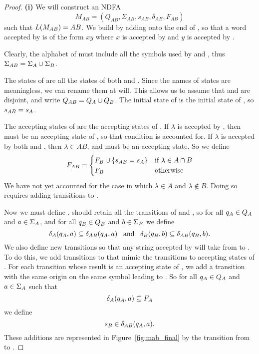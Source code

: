 \documentclass{bcthesis}
\begin{document}
\begin{proof}
		\noindent \textbf{(i)} \hspace{\parindent}
		We will construct an NDFA 
		\[
			M_{AB} = (Q_{AB}, \Sigma_{AB}, s_{AB}, \delta_{AB}, F_{AB})
		\]
		such that $L(M_{AB}) = AB$.
		We build \mab by adding \mb onto the end of \ma, so that a word accepted by \mab is of the form $xy$ where $x$ is accepted by \ma and $y$ is accepted by \mb.

		Clearly, the alphabet of \mab must include all the symbols used by \ma and \mb, thus $\Sigma_{AB} = \Sigma_A \cup \Sigma_B$.
		
		The states of \mab are all the states of both \ma and \mb.
		Since the names of states are meaningless, we can rename them at will. 
		This allows us to assume that \qa and \qb are disjoint, and write $Q_{AB} = Q_A \cup Q_B$.
		The initial state of \mab is the initial state of \ma, so $s_{AB} = s_A$.

		The accepting states of \mab are the accepting states of \mb.
		If $\lambda$ is accepted by \mb, then \sb must be an accepting state of \mb, so that condition is accounted for.
		If $\lambda$ is accepted by both \ma and \mb, then $\lambda \in AB$, and \sab must be an accepting state.
		So we define
		\[
			F_{AB} = 	\begin{cases}
						F_B \cup \{ s_{AB} = s_A \} &\text{if } \lambda \in A \cap B \\
						F_B &\text{otherwise}
					\end{cases}
		\]
		We have not yet accounted for the case in which $\lambda \in A$ and $\lambda \notin B$.
		Doing so requires adding transitions to \mab.

		Now we must define \dalab.
		\mab should retain all the transitions of \ma and \mb, so for all $q_A \in Q_A$ and $a \in \Sigma_A$, and for all $q_B \in Q_B$ and $b \in \Sigma_B$ we define
		\[
			\delta_A(q_A, a) \subseteq \delta_{AB}(q_A, a) \enspace \text{ and } \enspace \delta_B(q_B, b) \subseteq \delta_{AB}(q_B, b).
		\]
		We also define new transitions so that any string accepted by \ma will take \mab from \sa to \sb.
		To do this, we add transitions to \sb that mimic the transitions to accepting states of \ma.
		For each transition whose result is an accepting state of \ma, we add a transition with the same origin on the same symbol leading to \sb.
		So for all $q_A \in Q_A$ and $a \in \Sigma_A$ such that 
		\[
			\delta_A(q_A, a) \subseteq F_A
		\]
		we define
		\[
			s_B \in \delta_{AB}(q_A, a).
		\]
		These additions are represented in Figure~\ref{fig:mab_final} by the transition from \ma to \sb.


\end{proof}
\end{document}
